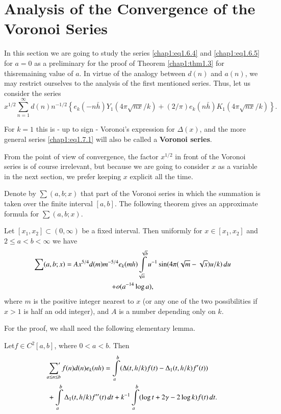 \section{Analysis of the Convergence of the Voronoi
  Series}\label{chap1:sec1.7} 

In this section we are going to study the series \eqref{chap1:eq1.6.4}
and \eqref{chap1:eq1.6.5} for $a=0$ as a preliminary for the proof of
Theorem \ref{chap1:thm1.3} for this\pageoriginale remaining value of
$a$. In virtue of the analogy between $d(n)$ and $a(n)$, we may
restrict ourselves to the analysis of the first mentioned
series. Thus, let us consider the series
\begin{equation}\label{chap1:eq1.7.1}
x^{1/2}\sum\limits_{n=1}^\infty d(n)n^{-1/2}\left\{ e_k(-n\bar{h})
Y_1(4\pi\sqrt{nx}/k)+(2/\pi)e_k(n\bar{h})K_1(4\pi\sqrt{nx}/k)\right\}.
\end{equation}

For $k=1$ this is - up to sign - Voronoi's expression for $\Delta(x)$,
and the more general series \eqref{chap1:eq1.7.1} will also be called
a {\bf Voronoi series}.

From the point of view of convergence, the factor $x^{1/2}$ in front
of the Voronoi series is of course irrelevant, but because we are
going to consider $x$ as a variable in the next section, we prefer
keeping $x$ explicit all the time.

Denote by $\sum(a,b;x)$ that part of the Voronoi series in which the
summation is taken over the finite interval $[a,b]$. The following
theorem gives an approximate formula for $\sum(a,b;x)$. 

\begin{THM}\label{chap1:thm1.4}
Let $[x_1,x_2]\subset (0,\infty)$ be a fixed interval. Then uniformly
for $x\in[x_1,x_2]$ and $2\leq a<b<\infty$ we have 
\begin{gather}
\sum(a,b;x)=Ax^{5/4}d(m)m^{-5/4}e_k(mh)
\int\limits_{\sqrt{a}}^{\sqrt{b}}u^{-1}\sin(4\pi(\sqrt{m}-\sqrt{x})u/k)
\,du\label{chap1:eq1.7.2}\\
+o(a^{-14}\log a),\notag
\end{gather}
where $m$ is the positive integer nearest to $x$ (or any one of the
two possibilities if $x>1$ is half an odd integer), and $A$ is a
number depending only on $k$.

For the proof, we shall need the following elementary lemma. 
\end{THM}

\begin{lem}\label{chap1:lem1.7}
Let\pageoriginale $f\in C^2[a,b]$, where $0<a<b$. Then 
\begin{align}
& \sideset{}{'}\sum\limits_{a\leq n\leq b}f(n)d(n)e_k(nh)=
\int\limits_a^b(\Delta(t,h/k)f(t)-\Delta_1(t,h/k)
f'(t))\label{chap1:eq1.7.3}\\
& +\int\limits_a^b\Delta_1(t,h/k)f''(t)\,dt+k^{-1} \int\limits_a^b
(\log t+2\gamma-2\log k)f(t)\,dt.\notag
\end{align}
\end{lem}

